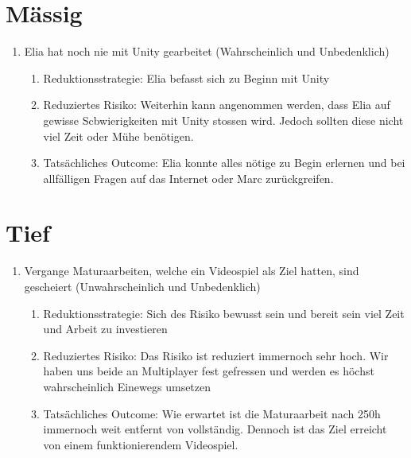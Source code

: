 \section{Mässig}
\begin{enumerate}
    \item Elia hat noch nie mit Unity gearbeitet (Wahrscheinlich und Unbedenklich)
    \begin{enumerate}
        \item Reduktionsstrategie: Elia befasst sich zu Beginn mit Unity
        \item Reduziertes Risiko: Weiterhin kann angenommen werden, dass Elia auf gewisse Scbwierigkeiten mit Unity stossen wird.
              Jedoch sollten diese nicht viel Zeit oder Mühe benötigen. 
        \item Tatsächliches Outcome: Elia konnte alles nötige zu Begin erlernen und bei allfälligen Fragen auf das Internet oder Marc zurückgreifen.
    \end{enumerate}
\end{enumerate}

\section{Tief}
\begin{enumerate}
    \item Vergange Maturaarbeiten, welche ein Videospiel als Ziel hatten, sind gescheiert (Unwahrscheinlich und Unbedenklich)
    \begin{enumerate}
        \item Reduktionsstrategie: Sich des Risiko bewusst sein und bereit sein viel Zeit und Arbeit zu investieren
        \item Reduziertes Risiko: Das Risiko ist reduziert immernoch sehr hoch.
            Wir haben uns beide an Multiplayer fest gefressen und werden es höchst wahrscheinlich Einewegs umsetzen
        \item Tatsächliches Outcome: Wie erwartet ist die Maturaarbeit nach 250h immernoch weit entfernt von vollständig.
            Dennoch ist das Ziel erreicht von einem funktionierendem Videospiel.
    \end{enumerate}
\end{enumerate}